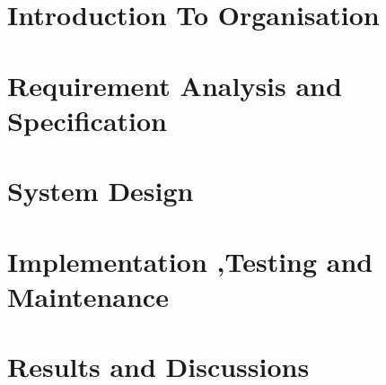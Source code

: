 \documentclass[12pt]{report}
\begin{document}

\begin{screen}
\ppttitle
\end{screen}
\footskip 0.7cm
\thispagestyle{empty} 
\pagetitle
\newpage
{}
\cfoot{\thepage}


\newpage

\newpage


\newpage
\tableofcontents
\newpage
\listoffigures
\newpage

\cfoot{\thepage}

\newpage
\chapter{Introduction To Organisation}

%
\newpage
\chapter{Requirement Analysis and Specification}

\newpage
\chapter{System Design}

\newpage
\chapter{Implementation ,Testing and Maintenance}

\newpage
\chapter{Results and Discussions}

\newpage
\end{document}
